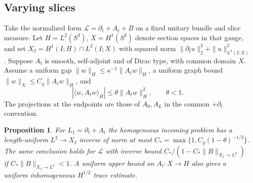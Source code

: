 \documentclass[11pt]{article}
\newtheorem{proposition}[theorem]{Proposition}
\theoremstyle{remark}
\newcommand{\ip}[2]{\langle #1,#2\rangle}
\begin{document}
\subsection{Varying slices}
Take the normalized form \(\mathcal L=\partial_t+A_t+B\) on a fixed unitary bundle and slice measure. Let \(H=L^2(S^3)\), \(X=H^1(S^3)\) denote section spaces in that gauge, and set \(X_I=H^1(I;H)\cap L^2(I;X)\) with squared norm \(\|\partial_tu\|_2^2+\|u\|_{L^2(I;X)}^2\). Suppose \(A_t\) is smooth, self-adjoint and of Dirac type, with common domain \(X\). Assume a uniform gap \(\|w\|_H\le\kappa^{-1}\|A_tw\|_H\), a uniform graph bound \(\|w\|_X\le C_g\|A_tw\|_H\), and
\begin{equation}
 |\ip{w}{\dot A_t w}_H|\le\theta\|A_tw\|_H^2,\qquad \theta<1 .
 \label{eq:relativeA}
\end{equation}
The projections at the endpoints are those of \(A_0,A_L\) in the common \(+\partial_t\) convention.

\begin{proposition}
For \(L_1=\partial_t+A_t\) the homogeneous incoming problem has a length-uniform \(L^2\to X_I\) inverse of norm at most \(C_*=\max\{1,C_g(1-\theta)^{-1/2}\}\). The same conclusion holds for \(\mathcal L\) with inverse bound \(C_* /(1-C_*\|B\|_{X_I\to L^2})\) if \(C_*\|B\|_{X_I\to L^2}<1\). A uniform upper bound on \(A_t:X\to H\) also gives a uniform inhomogeneous \(H^{1/2}\) trace estimate.
\end{proposition}
\end{document}
